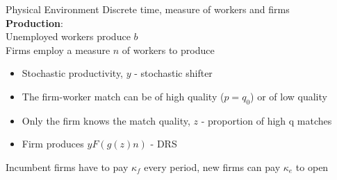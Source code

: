 \documentclass[9pt,aspectratio=169]{beamer} %
\begin{document}
\begin{frame}{Physical Environment}
Discrete time, measure of workers and firms \\
\vspace{10pt}
\textbf{Production}: \\
Unemployed workers produce $b$ \\

Firms employ a measure $n$ of workers to produce
    \begin{itemize}
        \item Stochastic productivity, $y$ - stochastic shifter
        \vspace{5pt}
        \item The firm-worker match can be of high quality ($p=q_0$) or of low quality
        \vspace{5pt}
        \item Only the firm knows the match quality, $z$ - proportion of high q matches
        \vspace{5pt}
        \item Firm produces $yF(g(z)n)$ - DRS
        \end{itemize}
\vspace{10pt}
Incumbent firms have to pay $\kappa_f$ every period, new firms can pay $\kappa_e$ to open
\end{frame}
\end{document}
